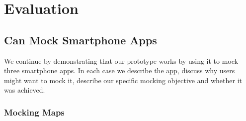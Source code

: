 \section{Evaluation}
\label{sec-evaluation}
\subsection{\PocketMocker{} Can Mock Smartphone Apps}
\label{subsec-mockingapps}

We continue by demonstrating that our \PocketMocker{} prototype works by using
it to mock three smartphone apps. In each case we describe the app, discuss why
users might want to mock it, describe our specific mocking objective and
whether it was achieved.

\subsubsection{Mocking Maps}


